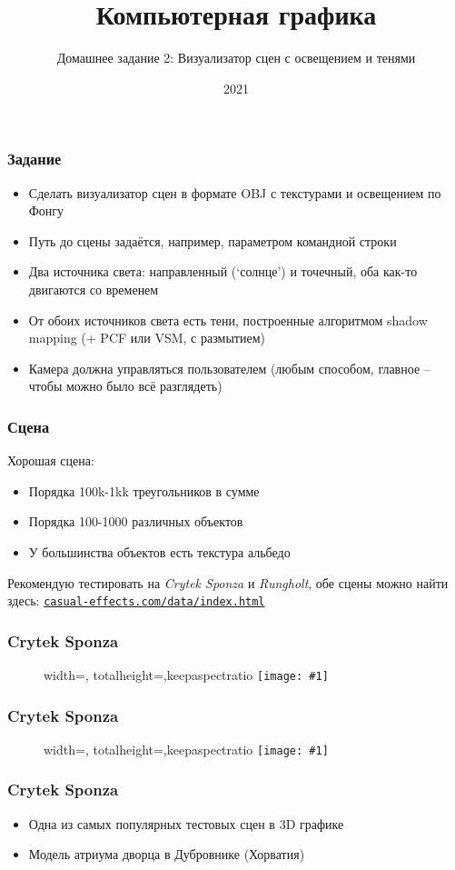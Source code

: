 \documentclass[10pt]{beamer}
\title{Компьютерная графика}
\subtitle{Домашнее задание 2: Визуализатор сцен с освещением и тенями}
\date{2021}
\newcommand{\slideimage}[1]{
  \begin{figure}
    \begin{adjustbox}{width=\textwidth, totalheight=\textheight-2\baselineskip-2\baselineskip,keepaspectratio}
      \texttt{[image: \#1]}
    \end{adjustbox}
  \end{figure}
}
\begin{document}
\frame{\titlepage}

\begin{frame}[fragile]
\frametitle{Задание}
\begin{itemize}
\item Сделать визуализатор сцен в формате OBJ с текстурами и освещением по Фонгу
\pause
\item Путь до сцены задаётся, например, параметром командной строки
\pause
\item Два источника света: направленный (`солнце') и точечный, оба как-то двигаются со временем
\pause
\item От обоих источников света есть тени, построенные алгоритмом shadow mapping (+ PCF или VSM, с размытием)
\pause
\item Камера должна управляться пользователем (любым способом, главное -- чтобы можно было всё разглядеть)
\end{itemize}
\end{frame}

\begin{frame}[fragile]
\frametitle{Сцена}
Хорошая сцена:
\begin{itemize}
\item Порядка 100k-1kk треугольников в сумме
\item Порядка 100-1000 различных объектов
\item У большинства объектов есть текстура альбедо
\end{itemize}
Рекомендую тестировать на \textit{Crytek Sponza} и \textit{Rungholt}, обе сцены можно найти здесь: \href{https://casual-effects.com/data/index.html}{\nolinkurl{casual-effects.com/data/index.html}}
\end{frame}

\begin{frame}[fragile]
\frametitle{Crytek Sponza}
\slideimage{crytek-sponza.jpg}
\end{frame}

\begin{frame}[fragile]
\frametitle{Crytek Sponza}
\slideimage{sponza_real.jpeg}
\end{frame}

\begin{frame}[fragile]
\frametitle{Crytek Sponza}
\begin{itemize}
\item Одна из самых популярных тестовых сцен в 3D графике
\item Модель атриума дворца в Дубровнике (Хорватия)
\end{itemize}
\end{frame}
\end{document}
